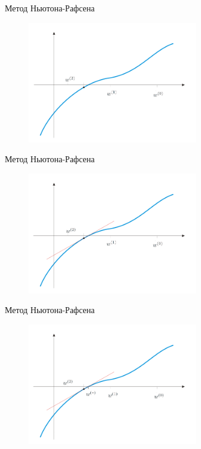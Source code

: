 \documentclass[10pt]{beamer}
\begin{document}
\begin{frame}{Метод Ньютона-Рафсена}
	\begin{figure}[htbp]
	  \includegraphics[height=150pt, keepaspectratio = true]{images/newton-14}   
	\end{figure}
\end{frame}

\begin{frame}{Метод Ньютона-Рафсена}
	\begin{figure}[htbp]
	  \includegraphics[height=150pt, keepaspectratio = true]{images/newton-15}   
	\end{figure}
\end{frame}

\begin{frame}{Метод Ньютона-Рафсена}
	\begin{figure}[htbp]
	  \includegraphics[height=150pt, keepaspectratio = true]{images/newton-16}   
	\end{figure}
\end{frame}
\end{document}
